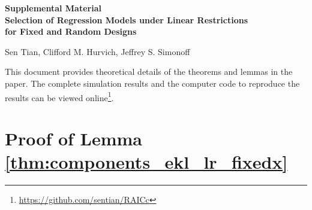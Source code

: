 \beginsupplement
\appendix
{}
\begin{center}
\textbf{\large Supplemental Material \\
Selection of Regression Models under Linear Restrictions \\ for Fixed and Random Designs}

Sen Tian, Clifford M. Hurvich, Jeffrey S. Simonoff
\end{center}

This document provides theoretical details of the theorems and lemmas in the paper. The complete simulation results and the computer code to reproduce the results can be viewed online\footnote{\url{https://github.com/sentian/RAICc}}.




\section{Proof of Lemma \ref{thm:components_ekl_lr_fixedx}}
